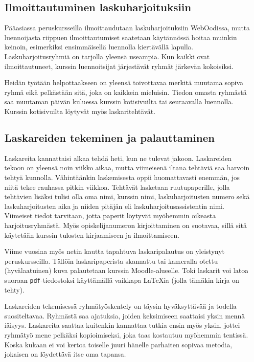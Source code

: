 \documentclass[../ala_hataile.tex]{subfiles}
\begin{document}
	\subsection*{Ilmoittautuminen laskuharjoituksiin}
	Pääasiassa peruskursseilla ilmoittaudutaan
	laskuharjoituksiin WebOodissa, mutta
	luennoijasta riippuen ilmoittautumiset saatetaan
	käytännössä hoitaa muinkin keinoin,
	esimerkiksi ensimmäisellä luennolla kiertävällä
	lapulla. Lasku\-harjoitus\-ryhmiä on
	tarjolla yleensä useampia. Kun kaikki ovat
	ilmoittautuneet, kurssin luennoitsijat järjestävät
	ryhmät järkevän kokoisiksi.
	
	Heidän työtään helpottaakseen on yleensä
	toivottavaa merkitä muutama sopiva
	ryhmä eikä pelkästään sitä, joka on kaikkein
	mieluisin. Tiedon omasta ryhmästä
	saa muutaman päivän kuluessa kurssin koti\-sivuilta
	tai seuraavalla luennolla. Kurssin
	koti\-sivuilta löytyvät myös laskari\-tehtävät.
	
	\subsection*{Laskareiden tekeminen ja palauttaminen}
	Laskareita kannattaisi alkaa tehdä heti,
	kun ne tulevat jakoon. Laskareiden tekoon
	on yleensä noin viikko aikaa, mutta viimeisenä
	iltana tehtäviä saa harvoin tehtyä
	kunnolla. Vähintäänkin laskemisesta oppii
	huomattavasti enemmän, jos niitä tekee
	rauhassa pitkin viikkoa. Tehtävät lasketaan
	ruutupaperille, jolla tehtävien lisäksi
	tulisi olla oma nimi, kurssin nimi, lasku\-harjoitusten
	numero sekä lasku\-harjoitusten
	aika ja niiden pitäjän eli lasku\-harjoitus\-assistentin
	nimi. Viimeiset tiedot tarvitaan,
	jotta paperit löytyvät myöhemmin oikeasta
	harjoitus\-ryhmästä. Myös opiskelija\-numeron
	kirjoittaminen on suotavaa, sillä sitä
	käytetään kurssin tulosten kirjaamiseen ja
	ilmoittamiseen.
	
	Viime vuosina myös netin kautta tapahtuva laskari\-palautus on yleistynyt peruskursseilla. Tällöin laskari\-paperista skannattu tai kameralla otettu (hyvä\-laatuinen) kuva palautetaan kurssin Moodle-alueelle. Toki laskarit voi latoa suoraan \texttt{pdf}-tiedostoksi käyttämällä vaikkapa {\LaTeX}ia (jolla tämäkin kirja on tehty).
	
	Laskareiden tekemisessä ryhmä\-työskentely on
	täysin hyväksyttävää ja todella suositeltavaa.
	Ryhmästä saa ajatuksia, joiden keksimiseen
	saattaisi yksin mennä iäisyys. Laskareita
	saattaa kuitenkin kannattaa tutkia
	ensin myös yksin, jottei ryhmä\-työ mene
	pelkäksi kopioimiseksi, joka taas kostautuu
	myöhemmin tentissä. Koska kukaan ei voi
	kertoa toiselle juuri hänelle parhaiten sopivaa
	metodia, jokaisen on löydettävä itse
	oma tapansa.
	
\end{document}
